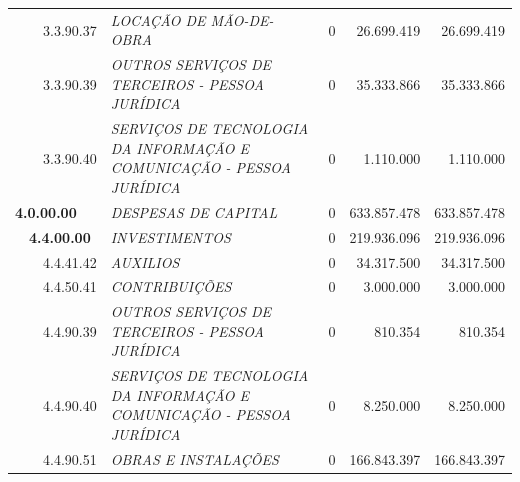 \documentclass{article}
\begin{document}
\begin{longtable}[c]{m{0.1cm}m{0.1cm}m{0.8cm}|m{8cm}|m{2cm}|m{2cm}|m{2cm}}
\multicolumn{1}{l}{} & \multicolumn{1}{l}{} & \multicolumn{1}{l|}{3.3.90.37} & \multicolumn{1}{L{8cm}|}{\textit{LOCAÇÃO DE MÃO-DE-OBRA}} & \multicolumn{1}{r|}{0} & \multicolumn{1}{r|}{26.699.419} &  \multicolumn{1}{r}{26.699.419}\\
\multicolumn{1}{l}{} & \multicolumn{1}{l}{} & \multicolumn{1}{l|}{3.3.90.39} & \multicolumn{1}{L{8cm}|}{\textit{OUTROS SERVIÇOS DE TERCEIROS - PESSOA JURÍDICA}} & \multicolumn{1}{r|}{0} & \multicolumn{1}{r|}{35.333.866} &  \multicolumn{1}{r}{35.333.866}\\
\multicolumn{1}{l}{} & \multicolumn{1}{l}{} & \multicolumn{1}{l|}{3.3.90.40} & \multicolumn{1}{L{8cm}|}{\textit{SERVIÇOS DE TECNOLOGIA DA INFORMAÇÃO E COMUNICAÇÃO -  PESSOA JURÍDICA}} & \multicolumn{1}{r|}{0} & \multicolumn{1}{r|}{1.110.000} &  \multicolumn{1}{r}{1.110.000}\\
\multicolumn{3}{l|}{\textbf{4.0.00.00}} & \multicolumn{1}{L{8cm}|}{\textit{DESPESAS DE CAPITAL}} & \multicolumn{1}{r|}{0} & \multicolumn{1}{r|}{633.857.478} &  \multicolumn{1}{r}{633.857.478}\\
\multicolumn{1}{l}{} & \multicolumn{2}{l|}{\textbf{4.4.00.00}} & \multicolumn{1}{L{8cm}|}{\textit{INVESTIMENTOS}} & \multicolumn{1}{r|}{0} & \multicolumn{1}{r|}{219.936.096} &  \multicolumn{1}{r}{219.936.096}\\
\multicolumn{1}{l}{} & \multicolumn{1}{l}{} & \multicolumn{1}{l|}{4.4.41.42} & \multicolumn{1}{L{8cm}|}{\textit{AUXILIOS}} & \multicolumn{1}{r|}{0} & \multicolumn{1}{r|}{34.317.500} &  \multicolumn{1}{r}{34.317.500}\\
\multicolumn{1}{l}{} & \multicolumn{1}{l}{} & \multicolumn{1}{l|}{4.4.50.41} & \multicolumn{1}{L{8cm}|}{\textit{CONTRIBUIÇÕES}} & \multicolumn{1}{r|}{0} & \multicolumn{1}{r|}{3.000.000} &  \multicolumn{1}{r}{3.000.000}\\
\multicolumn{1}{l}{} & \multicolumn{1}{l}{} & \multicolumn{1}{l|}{4.4.90.39} & \multicolumn{1}{L{8cm}|}{\textit{OUTROS SERVIÇOS DE TERCEIROS - PESSOA JURÍDICA}} & \multicolumn{1}{r|}{0} & \multicolumn{1}{r|}{810.354} &  \multicolumn{1}{r}{810.354}\\
\multicolumn{1}{l}{} & \multicolumn{1}{l}{} & \multicolumn{1}{l|}{4.4.90.40} & \multicolumn{1}{L{8cm}|}{\textit{SERVIÇOS DE TECNOLOGIA DA INFORMAÇÃO E COMUNICAÇÃO - PESSOA JURÍDICA}} & \multicolumn{1}{r|}{0} & \multicolumn{1}{r|}{8.250.000} &  \multicolumn{1}{r}{8.250.000}\\
\multicolumn{1}{l}{} & \multicolumn{1}{l}{} & \multicolumn{1}{l|}{4.4.90.51} & \multicolumn{1}{L{8cm}|}{\textit{OBRAS E INSTALAÇÕES}} & \multicolumn{1}{r|}{0} & \multicolumn{1}{r|}{166.843.397} &  \multicolumn{1}{r}{166.843.397}\\

\end{longtable}
\end{document}
